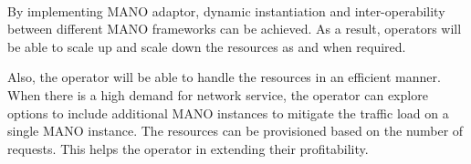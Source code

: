 \paragraph{}
By implementing MANO adaptor, dynamic instantiation and inter-operability between different MANO frameworks can be achieved. As a result, operators will be able to scale up and scale down the resources as and when required.

 Also, the operator will be able to handle the resources in an efficient manner. 
When there is a high demand for network service, the operator can explore options to include additional MANO instances to mitigate the traffic load on a single MANO instance. The resources can be provisioned based on the number of requests. This helps the operator in extending their profitability. 

























